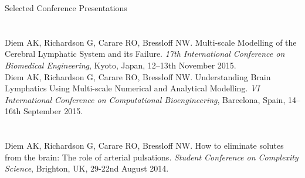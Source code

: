 \documentclass[margin,line]{res}
\begin{document}
\begin{resume}
\vspace*{-.2in}

{\sc Selected Conference Presentations}\\
\vspace*{-.35in}
\section{}
Diem AK, Richardson G, Carare RO, Bressloff NW. Multi-scale Modelling of the Cerebral Lymphatic System and its Failure. {\em 17th International Conference on Biomedical Engineering}, Kyoto, Japan, 12--13th November 2015.\\
Diem AK, Richardson G, Carare RO, Bressloff NW. Understanding Brain Lymphatics Using Multi-scale Numerical and Analytical Modelling. {\em VI International Conference on Computational Bioengineering}, Barcelona, Spain, 14--16th September 2015.\\
\vspace*{-.35in}
\section{}
Diem AK, Richardson G, Carare RO, Bressloff NW. How to eliminate solutes from the brain: The role of arterial pulsations. {\em Student Conference on Complexity Science}, Brighton, UK, 29-22nd August 2014.\\

\end{resume}
\end{document}
